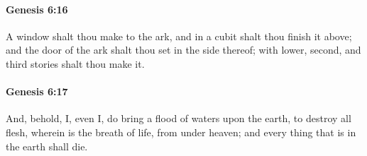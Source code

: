 		\paragraph{Genesis 6:16} %
			\label{GENESIS-6-16}

			A window shalt thou make to the ark, and in a cubit shalt thou finish it above; and the door of the ark shalt thou set in the side thereof; with lower, second, and third stories shalt thou make it.


		\paragraph{Genesis 6:17} %
			\label{GENESIS-6-17}

			And, behold, I, even I, do bring a flood of waters upon the earth, to destroy all flesh, wherein is the breath of life, from under heaven; and every thing that is in the earth shall die.


